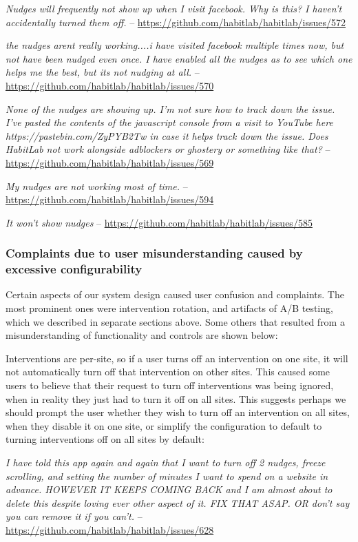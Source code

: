 \textit{Nudges will frequently not show up when I visit facebook. Why is this? I haven't accidentally turned them off.} -- \url{https://github.com/habitlab/habitlab/issues/572}

\textit{the nudges arent really working....i have visited facebook multiple times now, but not have been nudged even once. I have enabled all the nudges as to see which one helps me the best, but its not nudging at all.} -- \url{https://github.com/habitlab/habitlab/issues/570}

\textit{None of the nudges are showing up. I'm not sure how to track down the issue. I've pasted the contents of the javascript console from a visit to YouTube here https://pastebin.com/ZyPYB2Tw in case it helps track down the issue. Does HabitLab not work alongside adblockers or ghostery or something like that?} -- \url{https://github.com/habitlab/habitlab/issues/569}

\textit{My nudges are not working most of time.} -- \url{https://github.com/habitlab/habitlab/issues/594}

\textit{It won't show nudges} -- \url{https://github.com/habitlab/habitlab/issues/585}

\subsubsection{Complaints due to user misunderstanding caused by excessive configurability}

Certain aspects of our system design caused user confusion and complaints. The most prominent ones were intervention rotation, and artifacts of A/B testing, which we described in separate sections above. Some others that resulted from a misunderstanding of functionality and controls are shown below:

Interventions are per-site, so if a user turns off an intervention on one site, it will not automatically turn off that intervention on other sites. This caused some users to believe that their request to turn off interventions was being ignored, when in reality they just had to turn it off on all sites. This suggests perhaps we should prompt the user whether they wish to turn off an intervention on all sites, when they disable it on one site, or simplify the configuration to default to turning interventions off on all sites by default:

\textit{I have told this app again and again that I want to turn off 2 nudges, freeze scrolling, and setting the number of minutes I want to spend on a website in advance. HOWEVER IT KEEPS COMING BACK and I am almost about to delete this despite loving ever other aspect of it. FIX THAT ASAP. OR don't say you can remove it if you can't.} -- \url{https://github.com/habitlab/habitlab/issues/628}

